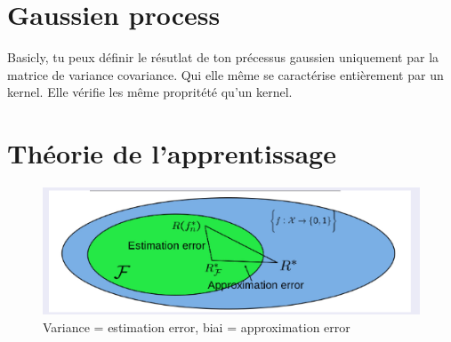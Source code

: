 \documentclass{article}
\theoremstyle{plain}%
\theoremstyle{definition}
\theoremstyle{remark}
\begin{document}
\section{Gaussien process}
Basicly, tu peux définir le résutlat de ton précessus gaussien uniquement par la matrice de variance covariance. Qui elle même se caractérise entièrement par un kernel. Elle vérifie les même propritété qu'un kernel.


\section{Théorie de l'apprentissage}
\begin{figure}[!htbp]
    \centering
    \includegraphics*[width=.65\textwidth]{biais-variance.png}
    \caption{Variance = estimation error, biai = approximation error}
    \label{<label>}
\end{figure}
\end{document}
